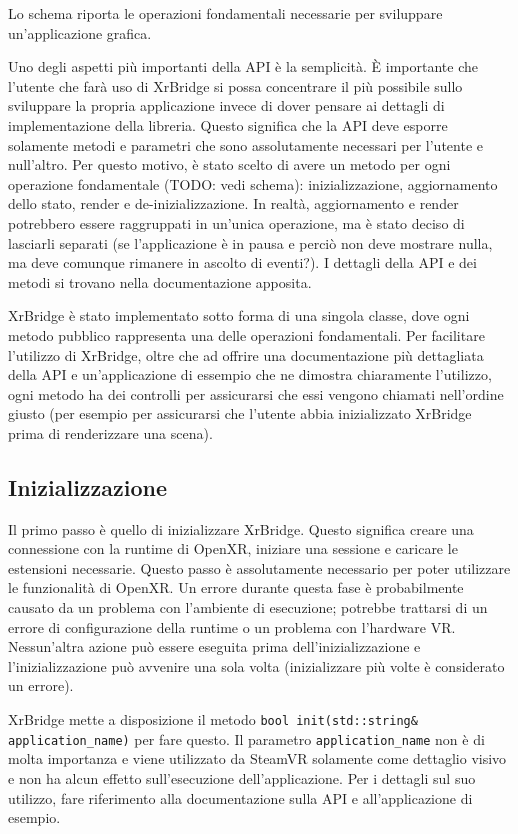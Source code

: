 \documentclass[twoside]{supsistudent}
\begin{document}
Lo schema riporta le operazioni fondamentali necessarie per sviluppare un'applicazione grafica.

Uno degli aspetti più importanti della API è la semplicità. È importante che l'utente che farà uso di XrBridge si possa concentrare il più possibile sullo sviluppare la propria applicazione invece di dover pensare ai dettagli di implementazione della libreria. Questo significa che la API deve esporre solamente metodi e parametri che sono assolutamente necessari per l'utente e null'altro. Per questo motivo, è stato scelto di avere un metodo per ogni operazione fondamentale (TODO: vedi schema): inizializzazione, aggiornamento dello stato, render e de-inizializzazione. In realtà, aggiornamento e render potrebbero essere raggruppati in un'unica operazione, ma è stato deciso di lasciarli separati (se l'applicazione è in pausa e perciò non deve mostrare nulla, ma deve comunque rimanere in ascolto di eventi?). I dettagli della API e dei metodi si trovano nella documentazione apposita.

XrBridge è stato implementato sotto forma di una singola classe, dove ogni metodo pubblico rappresenta una delle operazioni fondamentali. Per facilitare l'utilizzo di XrBridge, oltre che ad offrire una documentazione più dettagliata della API e un'applicazione di essempio che ne dimostra chiaramente l'utilizzo, ogni metodo ha dei controlli per assicurarsi che essi vengono chiamati nell'ordine giusto (per esempio per assicurarsi che l'utente abbia inizializzato XrBridge prima di renderizzare una scena).

\subsection{Inizializzazione}

Il primo passo è quello di inizializzare XrBridge. Questo significa creare una connessione con la runtime di OpenXR, iniziare una sessione e caricare le estensioni necessarie. Questo passo è assolutamente necessario per poter utilizzare le funzionalità di OpenXR. Un errore durante questa fase è probabilmente causato da un problema con l'ambiente di esecuzione; potrebbe trattarsi di un errore di configurazione della runtime o un problema con l'hardware VR. Nessun'altra azione può essere eseguita prima dell'inizializzazione e l'inizializzazione può avvenire una sola volta (inizializzare più volte è considerato un errore).

XrBridge mette a disposizione il metodo \texttt{bool init(std::string\& application\_name)} per fare questo. Il parametro \texttt{application\_name} non è di molta importanza e viene utilizzato da SteamVR solamente come dettaglio visivo e non ha alcun effetto sull'esecuzione dell'applicazione. Per i dettagli sul suo utilizzo, fare riferimento alla documentazione sulla API e all'applicazione di esempio.
\end{document}
